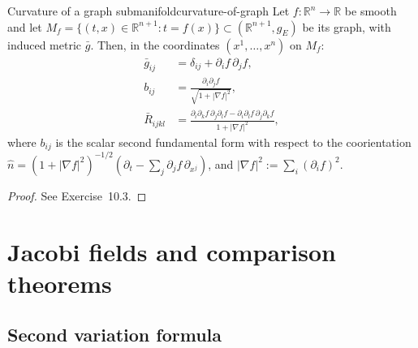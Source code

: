 \begin{colorlem}{Curvature of a graph submanifold}{curvature-of-graph}
Let $f \colon \mathbb{R}^n \to \mathbb{R}$ be smooth and let $M_f = \{(t, x) \in \mathbb{R}^{n+1} : t = f(x)\} \subset (\mathbb{R}^{n+1}, g_E)$ be its graph, with induced metric $\bar g$. Then, in the coordinates $(x^1, \ldots, x^n)$ on $M_f$:
\begin{align*}
    \bar g_{ij} &= \delta_{ij} + \partial_i f\, \partial_j f, \\
    b_{ij} &= \frac{\partial_i \partial_j f}{\sqrt{1 + |\nabla f|^2}}, \\
    \bar R_{ijkl} &= \frac{\partial_i \partial_k f\, \partial_j \partial_l f - \partial_i \partial_l f\, \partial_j \partial_k f}{1 + |\nabla f|^2},
\end{align*}
where $b_{ij}$ is the scalar second fundamental form with respect to the coorientation $\hat n = (1 + |\nabla f|^2)^{-1/2}(\partial_t - \sum_j \partial_j f\, \partial_{x^j})$, and $|\nabla f|^2 := \sum_i (\partial_i f)^2$.
\end{colorlem}

\begin{proof}
See Exercise~10.3.
\end{proof}











\section{Jacobi fields and comparison theorems}

\subsection{Second variation formula}


